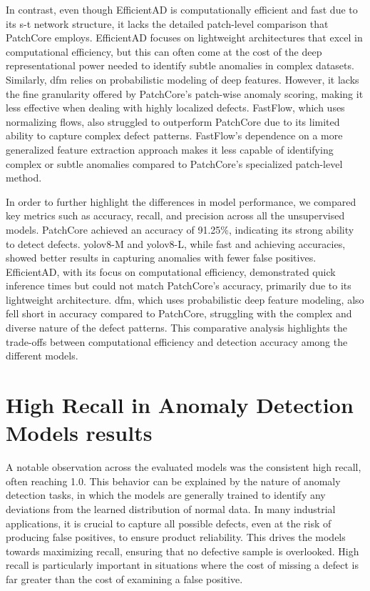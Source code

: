 In contrast, even though EfficientAD is computationally efficient and fast due to its \gls{s-t} network structure, it lacks the detailed patch-level comparison that PatchCore employs. EfficientAD focuses on lightweight architectures that excel in computational efficiency, but this can often come at the cost of the deep representational power needed to identify subtle anomalies in complex datasets. Similarly, \gls{dfm} relies on probabilistic modeling of deep features. However, it lacks the fine granularity offered by PatchCore's patch-wise anomaly scoring, making it less effective when dealing with highly localized defects. FastFlow, which uses normalizing flows, also struggled to outperform PatchCore due to its limited ability to capture complex defect patterns. FastFlow's dependence on a more generalized feature extraction approach makes it less capable of identifying complex or subtle anomalies compared to PatchCore's specialized patch-level method.

In order to further highlight the differences in model performance, we compared key metrics such as accuracy, recall, and precision across all the unsupervised models. PatchCore achieved an accuracy of 91.25\%, indicating its strong ability to detect defects. \gls{yolo}v8-M and \gls{yolo}v8-L, while fast and achieving accuracies, showed better results in capturing anomalies with fewer false positives. EfficientAD, with its focus on computational efficiency, demonstrated quick inference times but could not match PatchCore's accuracy, primarily due to its lightweight architecture. \gls{dfm}, which uses probabilistic deep feature modeling, also fell short in accuracy compared to PatchCore, struggling with the complex and diverse nature of the defect patterns. This comparative analysis highlights the trade-offs between computational efficiency and detection accuracy among the different models.

\section*{High Recall in Anomaly Detection Models results}

A notable observation across the evaluated models was the consistent high recall, often reaching 1.0. This behavior can be explained by the nature of anomaly detection tasks, in which the models are generally trained to identify any deviations from the learned distribution of normal data. In many industrial applications, it is crucial to capture all possible defects, even at the risk of producing false positives, to ensure product reliability. This drives the models towards maximizing recall, ensuring that no defective sample is overlooked. High recall is particularly important in situations where the cost of missing a defect is far greater than the cost of examining a false positive.

